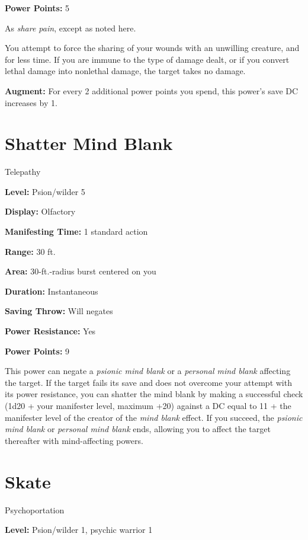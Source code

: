 \documentclass{article}
\begin{document}
\textbf{Power Points:} 5

As \textit{share pain}, except as noted here.

You attempt to force the sharing of your wounds with an unwilling creature, and 
for less time. If you are immune to the type of damage dealt, or if you convert 
lethal damage into nonlethal damage, the target takes no damage.

\textbf{Augment:} For every 2 additional power points you spend, this power's save 
DC increases by 1.

\vspace{12pt}
\section*{Shatter Mind Blank}

Telepathy

\textbf{Level:} Psion/wilder 5

\textbf{Display:} Olfactory

\textbf{Manifesting Time:} 1 standard action

\textbf{Range:} 30 ft.

\textbf{Area:} 30-ft.-radius burst centered on you

\textbf{Duration:} Instantaneous

\textbf{Saving Throw:} Will negates

\textbf{Power Resistance:} Yes

\textbf{Power Points:} 9

This power can negate a \textit{psionic mind blank }or a \textit{personal mind 
blank }affecting the target. If the target fails its save and does not overcome 
your attempt with its power resistance, you can shatter the mind blank by making 
a successful check (1d20 + your manifester level, maximum +20) against a DC equal 
to 11 + the manifester level of the creator of the \textit{mind blank }effect. 
If you succeed, the \textit{psionic mind blank }or \textit{personal mind blank 
}ends, allowing you to affect the target thereafter with mind-affecting powers.

\vspace{12pt}
\section*{Skate}

Psychoportation

\textbf{Level:} Psion/wilder 1, psychic warrior 1
\end{document}
